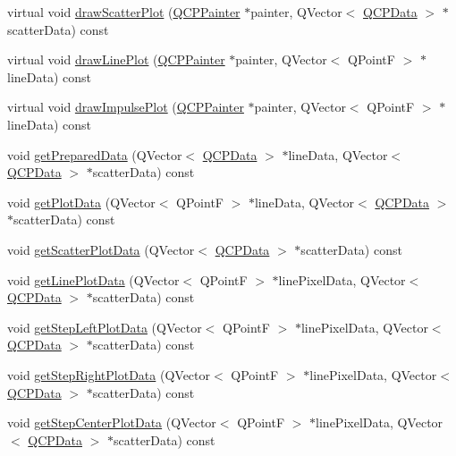 \begin{DoxyCompactItemize}
virtual void \hyperlink{class_q_c_p_graph_a6bdc385b122ce06134d4196373ae2250}{draw\+Scatter\+Plot} (\hyperlink{class_q_c_p_painter}{Q\+C\+P\+Painter} $\ast$painter, Q\+Vector$<$ \hyperlink{class_q_c_p_data}{Q\+C\+P\+Data} $>$ $\ast$scatter\+Data) const 
\item 
virtual void \hyperlink{class_q_c_p_graph_acebc22c3385829b19a87e6281fe6ade2}{draw\+Line\+Plot} (\hyperlink{class_q_c_p_painter}{Q\+C\+P\+Painter} $\ast$painter, Q\+Vector$<$ Q\+Point\+F $>$ $\ast$line\+Data) const 
\item 
virtual void \hyperlink{class_q_c_p_graph_abc01180629621f1e47e94559227d3d8c}{draw\+Impulse\+Plot} (\hyperlink{class_q_c_p_painter}{Q\+C\+P\+Painter} $\ast$painter, Q\+Vector$<$ Q\+Point\+F $>$ $\ast$line\+Data) const 
\item 
void \hyperlink{class_q_c_p_graph_ab420b46ba638dc3252439fe16687b244}{get\+Prepared\+Data} (Q\+Vector$<$ \hyperlink{class_q_c_p_data}{Q\+C\+P\+Data} $>$ $\ast$line\+Data, Q\+Vector$<$ \hyperlink{class_q_c_p_data}{Q\+C\+P\+Data} $>$ $\ast$scatter\+Data) const 
\item 
void \hyperlink{class_q_c_p_graph_a466c661e015188971c862031af946693}{get\+Plot\+Data} (Q\+Vector$<$ Q\+Point\+F $>$ $\ast$line\+Data, Q\+Vector$<$ \hyperlink{class_q_c_p_data}{Q\+C\+P\+Data} $>$ $\ast$scatter\+Data) const 
\item 
void \hyperlink{class_q_c_p_graph_a45c4214b59ea11aa6d8d112bdc3b0e03}{get\+Scatter\+Plot\+Data} (Q\+Vector$<$ \hyperlink{class_q_c_p_data}{Q\+C\+P\+Data} $>$ $\ast$scatter\+Data) const 
\item 
void \hyperlink{class_q_c_p_graph_ae3d82ffd0c9a883482aabf47b0e6b5ee}{get\+Line\+Plot\+Data} (Q\+Vector$<$ Q\+Point\+F $>$ $\ast$line\+Pixel\+Data, Q\+Vector$<$ \hyperlink{class_q_c_p_data}{Q\+C\+P\+Data} $>$ $\ast$scatter\+Data) const 
\item 
void \hyperlink{class_q_c_p_graph_a609cf4a78045b4d2a679bdff7623847e}{get\+Step\+Left\+Plot\+Data} (Q\+Vector$<$ Q\+Point\+F $>$ $\ast$line\+Pixel\+Data, Q\+Vector$<$ \hyperlink{class_q_c_p_data}{Q\+C\+P\+Data} $>$ $\ast$scatter\+Data) const 
\item 
void \hyperlink{class_q_c_p_graph_a3b9b8c8dc7a6fd9be6e253c25ee31809}{get\+Step\+Right\+Plot\+Data} (Q\+Vector$<$ Q\+Point\+F $>$ $\ast$line\+Pixel\+Data, Q\+Vector$<$ \hyperlink{class_q_c_p_data}{Q\+C\+P\+Data} $>$ $\ast$scatter\+Data) const 
\item 
void \hyperlink{class_q_c_p_graph_ad3713e7d8eb85a0afc34a81a5db5cd27}{get\+Step\+Center\+Plot\+Data} (Q\+Vector$<$ Q\+Point\+F $>$ $\ast$line\+Pixel\+Data, Q\+Vector$<$ \hyperlink{class_q_c_p_data}{Q\+C\+P\+Data} $>$ $\ast$scatter\+Data) const 

\end{DoxyCompactItemize}
